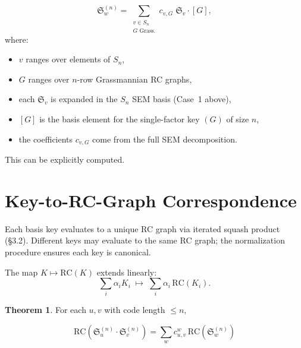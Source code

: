 \documentclass[11pt]{article}
\newcommand{\Sym}{S}
\newcommand{\RC}{\mathrm{RC}}
\newcommand{\Sch}{\mathfrak{S}}
\theoremstyle{definition}
\begin{document}
\[
  \Sch_w^{(n)} = \sum_{\substack{v \in \Sym_n \\ G \text{ Grass.}}} c_{v,G} \; \Sch_v \cdot [G],
\]
where:
\begin{itemize}
  \item $v$ ranges over elements of $\Sym_n$,
  \item $G$ ranges over $n$-row Grassmannian RC graphs,
  \item each $\Sch_v$ is expanded in the $\Sym_n$ SEM basis (Case~1 above),
  \item $[G]$ is the basis element for the single-factor key $(G)$ of size $n$,
  \item the coefficients $c_{v,G}$ come from the full SEM decomposition.
\end{itemize}

This can be explicitly computed.

\section{Key-to-RC-Graph Correspondence}

Each basis key evaluates to a unique RC graph via iterated squash product (\S3.2).  Different keys may evaluate to the same RC graph; the normalization procedure ensures each key is canonical.

The map $K \mapsto \RC(K)$ extends linearly:
\[
  \sum_i \alpha_i K_i \;\mapsto\; \sum_i \alpha_i \, \RC(K_i).
\]

\newtheorem{theorem}{Theorem}
\begin{theorem}
For each $u,v$ with code length $\leq n$, 

$$\RC(\Sch_u^{(n)} \cdot \Sch_v^{(n)}) = \sum_{w} c_{u,v}^w \, \RC(\Sch_w^{(n)})$$
\end{theorem}


\end{document}
